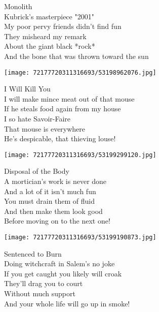 \documentclass[10pt,letterpaper]{article}
\begin{document}
\begin{center}
Monolith\\
\vskip 0.2in
Kubrick's masterpiece "2001"\\
My poor pervy friends didn't find fun\\
They misheard my remark\\
About the giant black *rock*\\
And the bone that was thrown toward the sun\\
\end{center}
\pagebreak

\begin{center}\texttt{[image: 72177720311316693/53198962076.jpg]}
\end{center}
\begin{center}
I Will Kill You\\
\vskip 0.2in
I will make mince meat out of that mouse\\
If he steals food again from my house\\
I so hate Savoir-Faire\\
That mouse is everywhere\\
He's despicable, that thieving louse!\\
\end{center}
\pagebreak

\begin{center}\texttt{[image: 72177720311316693/53199299120.jpg]}
\end{center}
\begin{center}
Disposal of the Body\\
\vskip 0.2in
A mortician's work is never done\\
And a lot of it isn't much fun\\
You must drain them of fluid\\
And then make them look good\\
Before moving on to the next one!\\
\end{center}
\pagebreak

\begin{center}\texttt{[image: 72177720311316693/53199190873.jpg]}
\end{center}
\begin{center}
Sentenced to Burn\\
\vskip 0.2in
Doing witchcraft in Salem's no joke\\
If you get caught you likely will croak\\
They'll drag you to court\\
Without much support\\
And your whole life will go up in smoke!\\
\end{center}
\pagebreak
\end{document}

